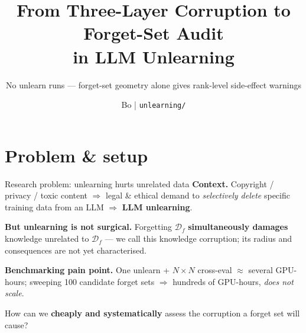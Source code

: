 \documentclass[aspectratio=169,10pt]{beamer}
\title{From Three-Layer Corruption to Forget-Set Audit\\ in LLM Unlearning}
\subtitle{No unlearn runs --- forget-set geometry alone gives rank-level side-effect warnings}
\date{}
\author{Bo \;|\; \texttt{unlearning/}}
\institute{Llama-3.1-8B-Instruct \;+\; GradAscent \;+\; WikiText-103 (HDBSCAN $\times$ 10)}
\begin{document}
\maketitle

\section{Problem \& setup}

\begin{frame}{Research problem: unlearning hurts unrelated data}
    \textbf{Context.}\;
    Copyright / privacy / toxic content $\Rightarrow$ legal \& ethical demand to
    \emph{selectively delete} specific training data from an LLM $\Rightarrow$
    \textbf{LLM unlearning}.

    \vspace{0.5em}
    \textbf{But unlearning is not surgical.}
    Forgetting $\mathcal{D}_f$ \textbf{simultaneously damages} knowledge unrelated to $\mathcal{D}_f$ ---
    we call this \alert{knowledge corruption}; its radius and consequences are not yet characterised.

    \vspace{0.5em}
    \textbf{Benchmarking pain point.}
    One unlearn + $N\!\times\!N$ cross-eval $\approx$ several GPU-hours;
    sweeping 100 candidate forget sets $\Rightarrow$ hundreds of GPU-hours, \emph{does not scale}.

    \vspace{0.8em}
    \begin{center}
        \large
        \alert{How can we \textbf{cheaply and systematically} assess the corruption a forget set will cause?}
    \end{center}
\end{frame}
\end{document}
